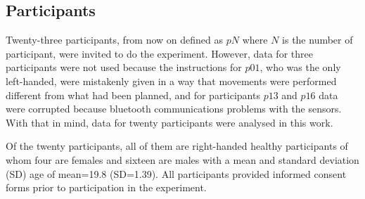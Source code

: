\documentclass[fleqn,10pt]{wlscirep}
\begin{document}
\subsection*{Participants}
Twenty-three participants,
from now on defined as $pN$ where $N$ is the number of participant, were 
invited to do the experiment. However, data for three participants were 
not used because the instructions for $p01$, who was the only left-handed,
were mistakenly given in a way that movements were performed different
from what had been planned, and for participants $p13$ and $p16$ 
data were corrupted because bluetooth communications problems with the 
sensors. With that in mind, data for twenty participants were analysed in 
this work.

Of the twenty participants, all of them are right-handed healthy participants 
of whom four are females and sixteen are males with a mean and standard 
deviation (SD) age of mean=19.8 (SD=1.39). All participants provided 
informed consent forms prior to participation in the experiment.
\end{document}
